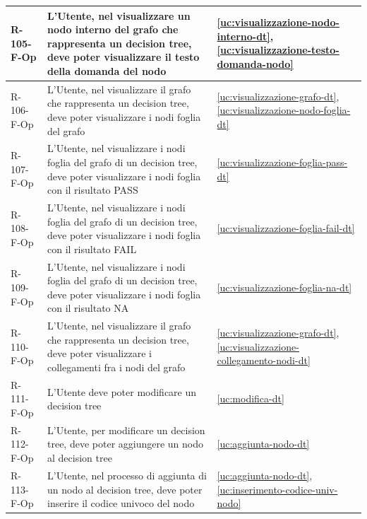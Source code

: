 ﻿\documentclass[a4paper,12pt]{article}
\begin{document}
{{\begin{longtable}{|l|p{}|p{}|}
            R-105-F-Op       & L'Utente, nel visualizzare un nodo interno del grafo che rappresenta un decision tree, deve poter visualizzare il testo della domanda del nodo                                              & \ref{uc:visualizzazione-nodo-interno-dt}, \ref{uc:visualizzazione-testo-domanda-nodo} \\ \hline
            R-106-F-Op       & L'Utente, nel visualizzare il grafo che rappresenta un decision tree, deve poter visualizzare i nodi foglia del grafo                                                                       & \ref{uc:visualizzazione-grafo-dt}, \ref{uc:visualizzazione-nodo-foglia-dt}         \\ \hline
            R-107-F-Op       & L'Utente, nel visualizzare i nodi foglia del grafo di un decision tree, deve poter visualizzare i nodi foglia con il risultato PASS & \ref{uc:visualizzazione-foglia-pass-dt}         \\ \hline
            R-108-F-Op       & L'Utente, nel visualizzare i nodi foglia del grafo di un decision tree, deve poter visualizzare i nodi foglia con il risultato FAIL & \ref{uc:visualizzazione-foglia-fail-dt}         \\ \hline
            R-109-F-Op       & L'Utente, nel visualizzare i nodi foglia del grafo di un decision tree, deve poter visualizzare i nodi foglia con il risultato NA & \ref{uc:visualizzazione-foglia-na-dt}         \\ \hline
            R-110-F-Op       & L'Utente, nel visualizzare il grafo che rappresenta un decision tree, deve poter visualizzare i collegamenti fra i nodi del grafo                                                           & \ref{uc:visualizzazione-grafo-dt}, \ref{uc:visualizzazione-collegamento-nodi-dt}         \\ \hline
            R-111-F-Op       & L'Utente deve poter modificare un decision tree                                                                                                                                             & \ref{uc:modifica-dt}                                               \\ \hline
            R-112-F-Op       & L'Utente, per modificare un decision tree, deve poter aggiungere un nodo al decision tree                                                                                                   & \ref{uc:aggiunta-nodo-dt}                                               \\ \hline
            R-113-F-Op       & L'Utente, nel processo di aggiunta di un nodo al decision tree, deve poter inserire il codice univoco del nodo                                                                              & \ref{uc:aggiunta-nodo-dt}, \ref{uc:inserimento-codice-univ-nodo}                 \\ \hline

\end{longtable}}}
\end{document}
